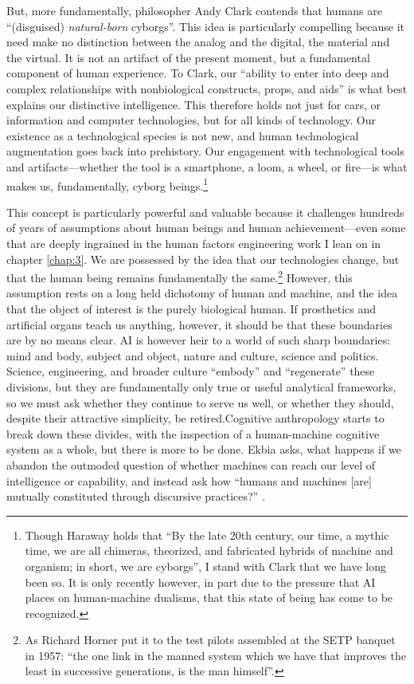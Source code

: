 But, more fundamentally, philosopher Andy
Clark contends that humans are ``(disguised) \emph{natural-born}
cyborgs''\cite[p. 66]{ekbia}. This idea is particularly compelling
because it need make no distinction between the analog and the
digital, the material and the virtual. It is not an artifact of the
present moment, but a fundamental component of human experience. To
Clark, our ``ability to enter into deep and complex relationships with
nonbiological constructs, props, and aids'' is what best explains our
distinctive intelligence\cite[p. 66-67]{ekbia}. This therefore holds
not just for cars, or information and computer technologies, but for
all kinds of technology. Our existence as a technological species is
not new, and human technological augmentation goes back into
prehistory. Our engagement with technological tools and
artifacts---whether the tool is a smartphone, a loom, a wheel, or
fire---is what makes us, fundamentally, cyborg beings.\footnote{Though Haraway holds that ``By the late 20th
century, our time, a mythic time, we are all chimeras,
theorized, and fabricated hybrids of machine and organism; in short,
we are cyborgs''\cite[p. 118]{???-haraway}, I stand with Clark that we
have long been so. It is only recently however, in part due to the pressure
that AI places on human-machine dualisms, that this state of being has
come to be recognized.}

This concept is particularly powerful and valuable because it
challenges hundreds of years of assumptions about human beings and
human achievement---even some that are deeply ingrained in the human
factors engineering work I lean on in chapter \ref{chap:3}. We are
possessed by the idea that our technologies change, but that the human
being remains fundamentally the same.\footnote{As Richard Horner put
  it to the test pilots assembled at the SETP banquet in 1957: ``the
  one link in the manned system which we have that improves the least
  in successive generations, is the man himself''\cite[p.
    19]{???-mindell}.} However, this assumption rests on a long held 
dichotomy of human and machine, and the idea that the object of
interest is the purely biological human. If prosthetics and artificial
organs teach us anything, however, it should be that these boundaries
are by no means clear. AI is however heir to a world of such sharp
boundaries: mind and body, subject
and object, nature and culture, science and politics\cite[p.
  327]{ekbia}. Science, engineering, and broader culture ``embody'' and
``regenerate'' these divisions\cite[p. 327]{ekbia}, but they are
fundamentally only true or useful analytical frameworks, so we must
ask whether they continue to serve us well, or whether they should,
despite their attractive simplicity, be retired.\footnotemark Cognitive
anthropology starts to break down these 
divides, with the inspection of a human-machine cognitive system as a
whole, but there is more to be done. Ekbia asks, what happens if we
abandon the outmoded question of whether machines can reach our level
of intelligence or capability, and instead ask how  ``humans and machines
[are] mutually constituted through discursive practices?'' \cite[p.
  328]{ekbia}. 

